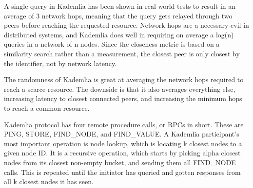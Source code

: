 A single query in Kademlia has been shown in real-world tests to result in an average of 3 network hops, meaning that the query gets relayed through two peers before reaching the requested resource.\cite{Roos2013-mb} Network hops are a necessary evil in distributed systems, and Kademlia does well in requiring on average a log(n) queries in a network of n nodes. Since the closeness metric is based on a similarity search rather than a measurement, the closest peer is only closest by the identifier, not by network latency.\cite{Eigenmann2020-zm}
						
The randomness of Kademlia is great at averaging the network hops required to reach a scarce resource. The downside is that it also averages everything else, increasing latency to closest connected peers, and increasing the minimum hops to reach a common resource.

Kademlia protocol has four remote procedure calls, or RPCs in short. These are PING, STORE, FIND\_NODE, and FIND\_VALUE. A Kademlia participant's most important operation is node lookup, which is locating k closest nodes to a given node ID. It is a recursive operation, which starts by picking alpha closest nodes from its closest non-empty bucket, and sending them all FIND\_NODE calls. This is repeated until the initiator has queried and gotten responses from all k closest nodes it has seen.




